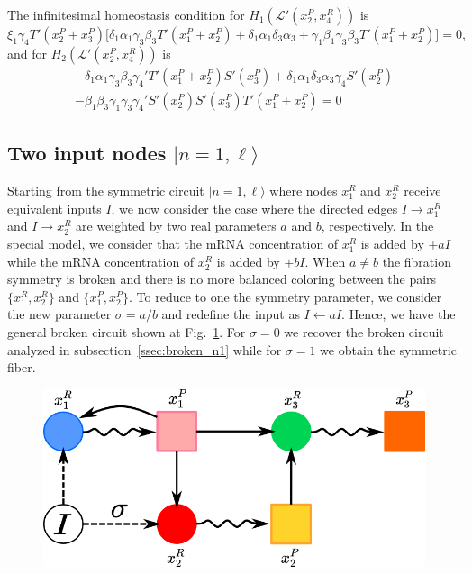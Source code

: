 The infinitesimal homeostasis condition for 
$H_1(\mathcal{L}'(x_2^P, x_4^R))$ is
\begin{equation}
    \xi_1 \gamma_4 T'(x_2^P + x_3^P)\big[ \delta_1 \alpha_1 
    \gamma_3 \beta_3 T'(x_1^P + x_2^P) + 
    \delta_1 \alpha_1 \delta_3 \alpha_3 + 
    \gamma_1 \beta_1 \gamma_3 \beta _3 T'(x_1^P + x_2^P) \big] = 0,
\end{equation} 
and for 
$H_2(\mathcal{L}'(x_2^P, x_4^R))$ is 
\begin{equation}
    \begin{split}
    - \delta_1 \alpha_1 \gamma_3 \beta_3 \gamma_4' T'(x_1^P + x_2^P)S'(x_3^P)
    +  \delta_1 \alpha_1 \delta_3 \alpha_3 \gamma_4 S'(x_2^P)\\
    -  \beta_1 \beta_3 \gamma_1 \gamma_3 \gamma_4' S'(x_2^P)S'(x_3^P)T'(x_1^P + x_2^P) = 0     
    \end{split}
\end{equation} 

\subsection{Two input nodes $|n=1, \ell \rangle$}
\label{ssec:broken_n1_2input}

Starting from the symmetric circuit $|n=1, \ell \rangle$ where nodes 
$x_1^R$ and $x_2^R$ receive equivalent inputs $I$, we now consider 
the case where the directed edges $I \rightarrow x_1^R$ and 
$I \rightarrow x_2^R$ are weighted by two real parameters $a$ and 
$b$, respectively. In the special model, we consider that the mRNA 
concentration of $x_1^R$ is added by $+aI$ while the mRNA concentration 
of $x_2^R$ is added by $+bI$. When $a \neq b$
the fibration symmetry is broken and there is no more balanced coloring between 
the pairs $\{ x_1^R, x_2^R \}$ and $\{ x_1^P, x_2^P \}$. To reduce to one the 
symmetry parameter, we consider the new parameter $\sigma = a/b$ and redefine 
the input as $I \leftarrow aI$. Hence, we have the general broken circuit shown
at Fig.~\ref{fig:broken_n1_two}. For $\sigma = 0$ we recover the broken circuit 
analyzed in subsection~\ref{ssec:broken_n1} while for $\sigma = 1$ we obtain the 
symmetric fiber. 

\begin{figure}[H]
    \centering
    \includegraphics[scale=0.65]{figs/broken_n1_1.png}
    \caption{}
    \label{fig:broken_n1_two}
\end{figure}


